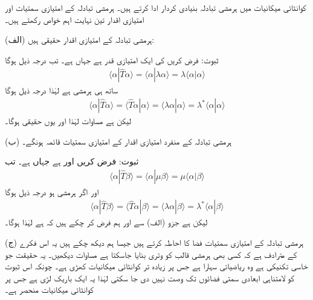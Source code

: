 کوانٹائی میکانیات میں ہرمشی تبادلہ  بنیادی کردار ادا کرتے ہیں۔ ہرمشی تبادلہ کے امتیازی سمتیات اور امتیازی اقدار تین نہایت اہم خواص رکھتے ہیں۔

(الف) ہرمشی تبادلہ کے امتیازی اقدار حقیقی ہیں:

ثبوت: فرض کریں  کی ایک امتیازی قدر  ہے  جہاں  ہے۔ تب درجہ ذیل ہوگا
\begin{align*}
	\langle\alpha|\hat{T}\alpha\rangle = \langle\alpha|\lambda\alpha\rangle = \lambda\langle\alpha|\alpha\rangle
\end{align*}
ساتھ ہی  ہرمشی ہے لہٰذا درجہ ذیل ہوگا
\begin{align*}
	\langle\alpha|\hat{T}\alpha\rangle = \langle\hat{T}\alpha|\alpha\rangle = \langle\lambda\alpha|\alpha\rangle = \lambda^*\langle\alpha|\alpha\rangle
\end{align*}
لیکن  ہے مساوات  لہٰذا  اور یوں  حقیقی ہوگا۔

(ب) ہرمشی تبادلہ کے منفرد امتیازی اقدار کے امتیازی سمتیات قائمہ ہونگے۔

ثبوت: فرض کریں  اور  ہے جہاں  ہے۔ تب
\begin{align*}
	\langle\alpha|\hat{T}\beta\rangle = \langle\alpha|\mu\beta\rangle = \mu\langle\alpha|\beta\rangle
\end{align*}
اور اگر  ہرمشی ہو درجہ ذیل ہوگا
\begin{align*}
	\langle\alpha|\hat{T}\beta\rangle = \langle\hat{T}\alpha|\beta\rangle = \langle\lambda\alpha|\beta\rangle = \lambda^*\langle\alpha|\beta\rangle
\end{align*}
لیکن  ہے جزو (الف) سے اور ہم فرض کر چکے ہیں کہ  ہے لہٰذا  ہوگا۔

(ج) ہرمشی تبادلہ کے امتیازی سمتیات فضا کا احاطہ کرتے ہیں جیسا ہم دیکھ چکے ہیں یہ اس فکرے کے مترادف ہے کہ کسی بھی ہرمشی قالب کو وتری بنایا جاسکتا ہے مساوات  دیکھیں۔ یہ حقیقت جو خاسی تکنیکی ہے وہ ریاضیاتی سہارا ہے جس پر زیادہ تر کوانٹائی میکانیات کھڑی ہے۔ چونکہ اس ثبوت کو لامتناہی ابعادی سمتی فضائوں تک وصت نہیں دی جا سکتی لہٰذا یہ ایک باریک لڑی ہے جس پر کوانٹائی میکانیات منحصر ہے۔

